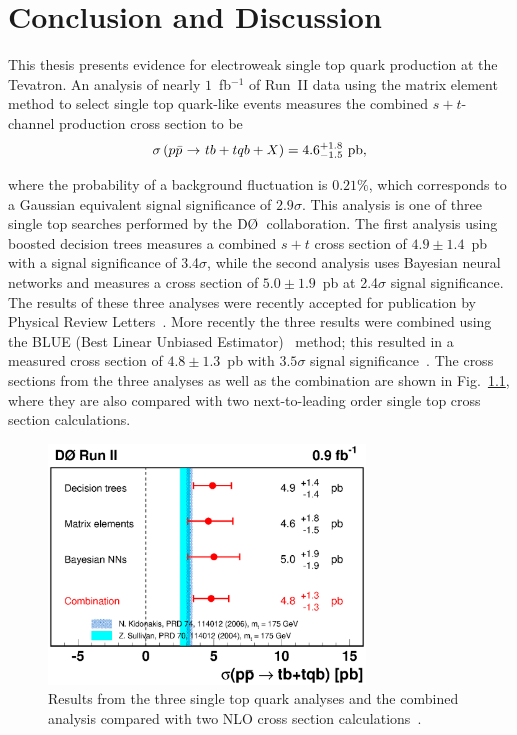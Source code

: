 \chapter{Conclusion and Discussion}
\label{conclusion}

This thesis presents evidence for electroweak single top quark production at the Tevatron. An analysis of nearly $1$~fb$^{-1}$ of Run~II data using the matrix element method to select single top quark-like events measures the combined $s+t$-channel production cross section to be
$$
\sigma\left({\mbox{$p\bar{p}$}}{\mbox{ $\rightarrow$ }}tb+tqb+X\right)
= 4.6 ^{+1.8}_{-1.5}~{\rm pb},
$$

\noindent where the probability of a background fluctuation is $0.21\%$, which corresponds to a Gaussian equivalent signal significance of $2.9\sigma$. This analysis is one of three single top searches performed by the $\dzero$~collaboration. The first analysis using boosted decision trees measures a combined $s+t$ cross section of $4.9\pm1.4$~pb with a signal significance of 3.4$\sigma$, while the second analysis uses Bayesian neural networks and measures a cross section of $5.0\pm1.9$~pb at 2.4$\sigma$ signal significance. The results of these three analyses were recently accepted for publication by Physical Review Letters~\cite{Abazov:2006gd}. More recently the three results were combined using the BLUE (Best Linear Unbiased Estimator)~\cite{1988NIMPA.270..110L} method; this resulted in a measured cross section of $4.8\pm1.3$~pb with $3.5\sigma$ signal significance~\cite{comb}. The cross sections from the three analyses as well as the combination are shown in Fig.~\ref{singletopanalysis}, where they are also compared with two next-to-leading order single top cross section calculations.

\begin{figure}[!h!tbp]
\begin{center}
\includegraphics[width=0.75\textwidth]{eps/Conclusion/ResultsComb.eps}
\end{center}
\vspace{-0.1in}
\caption{Results from the three single top quark analyses and the combined analysis compared with two NLO cross section calculations~\cite{comb}.}
\label{singletopanalysis}
\end{figure}

